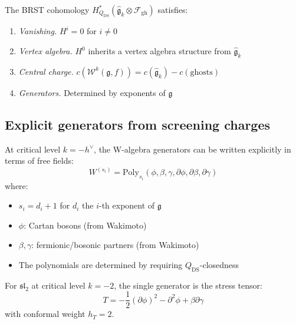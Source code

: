 \begin{theorem}\label{thm:brst-properties}
The BRST cohomology $H^*_{Q_{\text{DS}}}(\widehat{\mathfrak{g}}_k \otimes \mathcal{F}_{\text{gh}})$ satisfies:
\begin{enumerate}
\item \emph{Vanishing.} $H^i = 0$ for $i \neq 0$
\item \emph{Vertex algebra.} $H^0$ inherits a vertex algebra structure from $\widehat{\mathfrak{g}}_k$
\item \emph{Central charge.} $c(\mathcal{W}^k(\mathfrak{g}, f)) = c(\widehat{\mathfrak{g}}_k) - c(\text{ghosts})$
\item \emph{Generators.} Determined by exponents of $\mathfrak{g}$
\end{enumerate}
\end{theorem}

\subsection{Explicit generators from screening charges}

\begin{theorem}\label{thm:generators-screening}
At critical level $k = -h^\vee$, the W-algebra generators can be written explicitly in terms of free fields:
\begin{equation}
W^{(s_i)} = \text{Poly}_{s_i}(\phi, \beta, \gamma, \partial\phi, \partial\beta, \partial\gamma)
\end{equation}
where:
\begin{itemize}
\item $s_i = d_i + 1$ for $d_i$ the $i$-th exponent of $\mathfrak{g}$
\item $\phi$: Cartan bosons (from Wakimoto)
\item $\beta, \gamma$: fermionic/bosonic partners (from Wakimoto)
\item The polynomials are determined by requiring $Q_{\text{DS}}$-closedness
\end{itemize}
\end{theorem}

\begin{example}
For $\mathfrak{sl}_2$ at critical level $k = -2$, the single generator is the stress tensor:
\begin{equation}
T = -\frac{1}{2}(\partial \phi)^2 - \partial^2 \phi + \beta \partial \gamma
\end{equation}
with conformal weight $h_T = 2$.
\end{example}

